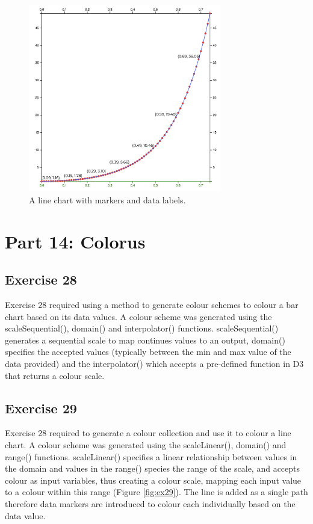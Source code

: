 \documentclass[11pt]{article}   	%
\begin{document}
\begin{figure}[H]
\centering
\includegraphics[width=0.75\textwidth]{data/ex27.png}
\caption{ A line chart with markers and data labels.}
\label{fig:ex27}
\end{figure}


\section{Part 14: Colorus}
\subsection{ Exercise 28 }
\vspace{-1em}
Exercise 28 required using a method to generate colour schemes to colour a bar chart based on its data values. A colour scheme was generated using the scaleSequential(), domain() and interpolator() functions. scaleSequential() generates a sequential scale to map continues values to an output, domain() specifies the accepted values (typically between the min and max value of the data provided) and the interpolator() which accepts a pre-defined function in D3 that returns a colour scale.



\subsection{Exercise 29 }
\vspace{-1em}
Exercise 28 required to generate a colour collection and use it to colour a line chart. A colour scheme was generated using the scaleLinear(), domain() and range() functions. scaleLinear() specifies a linear relationship between values in the domain and values in the range() species the range of the scale, and accepts colour as input variables, thus creating a colour scale, mapping each input value to a colour within this range (Figure \ref{fig:ex29}). The line is added as a single path therefore data markers are introduced to colour each individually based on the data value.
\end{document}

